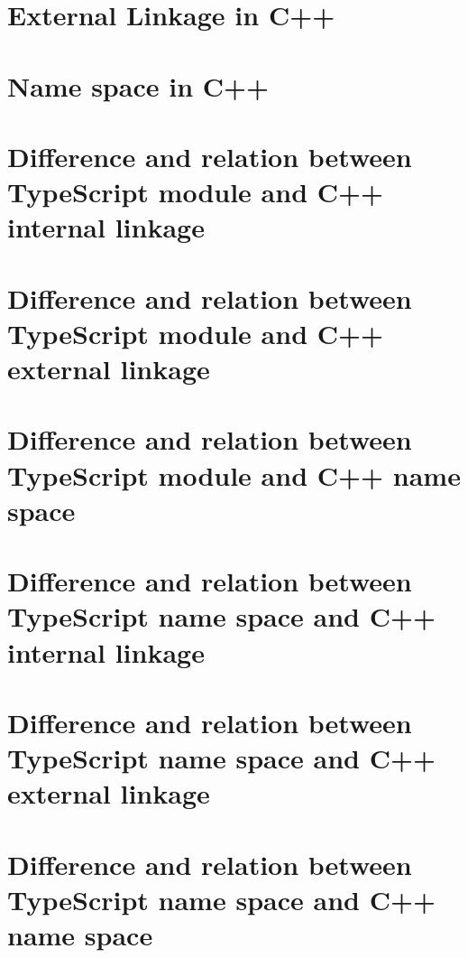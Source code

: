 \documentclass[a4paper]{report}
\begin{document}
\section{External Linkage in C++}

\section{Name space in C++}

\section{Difference and relation between TypeScript module and C++ internal linkage}

\section{Difference and relation between TypeScript module and C++ external linkage}

\section{Difference and relation between TypeScript module and C++ name space}

\section{Difference and relation between TypeScript name space and C++ internal linkage}

\section{Difference and relation between TypeScript name space and C++ external linkage}

\section{Difference and relation between TypeScript name space and C++ name space}
\end{document}
